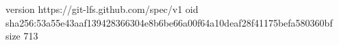 version https://git-lfs.github.com/spec/v1
oid sha256:53a55e43aaf139428366304e8b6be66a00f64a10deaf28f41175befa580360bf
size 713
